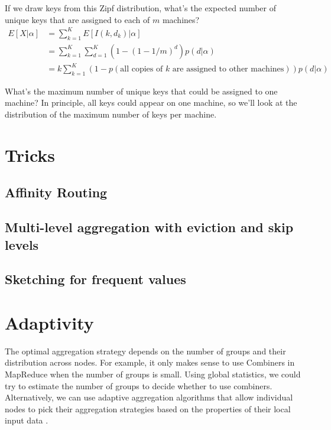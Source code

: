 \documentclass[12pt]{article}
\begin{document}
If we draw keys from this Zipf distribution, what's the expected number of unique keys that are assigned to each of $m$ machines?
\begin{align*}
    E[X|\alpha] &= \sum_{k=1}^K E[I(k, d_k) | \alpha]
\\              &= \sum_{k=1}^K \sum_{d=1}^K \left(1 - \left(1 - 1/m\right)^d\right)p(d | \alpha)
\\              &= k \sum_{k=1}^K\left(1 - p\left(\text{all copies of $k$ are assigned to other machines}\right)\right) p(d | \alpha)
\end{align*}

What's the maximum number of unique keys that could be assigned to one machine?  In principle, all keys could appear on one machine, so we'll look at the distribution of the maximum number of keys per machine.


\pagebreak
\section{Tricks}

\subsection{Affinity Routing}

\subsection{Multi-level aggregation with eviction and skip levels}

\subsection{Sketching for frequent values}


\section{Adaptivity}

The optimal aggregation strategy depends on the number of groups and their
distribution across nodes.
For example, it only makes sense to use Combiners in MapReduce when the number of groups is small.
Using global statistics, we could try to estimate the number of groups to decide whether to use combiners.
Alternatively, we can use adaptive aggregation algorithms that allow individual nodes to pick their aggregation strategies based on the properties of their local input data \cite{adaptive-aggregation}.
\end{document}
